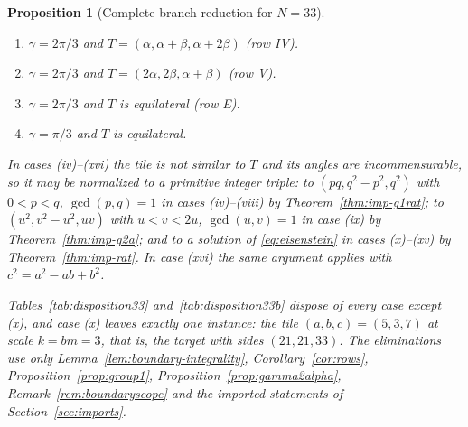 \documentclass[11pt]{amsart}
\newtheorem{proposition}[theorem]{Proposition}
\theoremstyle{definition}
\theoremstyle{remark}
\begin{document}
\begin{proposition}[Complete branch reduction for $N=33$]
\begin{enumerate}[label=\textup{(\roman*)},leftmargin=2.6em]
      \textup{(row III)}.
\item $\gamma=2\pi/3$ and $T=(\alpha,\alpha+\beta,\alpha+2\beta)$
      \textup{(row IV)}.
\item $\gamma=2\pi/3$ and $T=(2\alpha,2\beta,\alpha+\beta)$
      \textup{(row V)}.
\item $\gamma=2\pi/3$ and $T$ is equilateral \textup{(row E)}.
\item $\gamma=\pi/3$ and $T$ is equilateral.
\end{enumerate}
In cases \textup{(iv)--(xvi)} the tile is not similar to $T$ and its angles
are incommensurable, so it may be normalized to a primitive integer triple:
to $(pq,q^2-p^2,q^2)$ with $0<p<q$, $\gcd(p,q)=1$ in cases
\textup{(iv)--(viii)} by Theorem~\ref{thm:imp-g1rat}; to
$(u^2,v^2-u^2,uv)$ with $u<v<2u$, $\gcd(u,v)=1$ in case \textup{(ix)} by
Theorem~\ref{thm:imp-g2a}; and to a solution of \eqref{eq:eisenstein} in
cases \textup{(x)--(xv)} by Theorem~\ref{thm:imp-rat}.  In case
\textup{(xvi)} the same argument applies with $c^2=a^2-ab+b^2$.

Tables~\ref{tab:disposition33} and~\ref{tab:disposition33b} dispose of every case except
\textup{(x)}, and case \textup{(x)} leaves exactly one instance: the tile
$(a,b,c)=(5,3,7)$ at scale $k=bm=3$, that is, the target with sides
$(21,21,33)$.  The eliminations use only
Lemma~\ref{lem:boundary-integrality}, Corollary~\ref{cor:rows},
Proposition~\ref{prop:group1}, Proposition~\ref{prop:gamma2alpha},
Remark~\ref{rem:boundaryscope} and the imported statements of
Section~\ref{sec:imports}.
\end{proposition}
\end{document}

